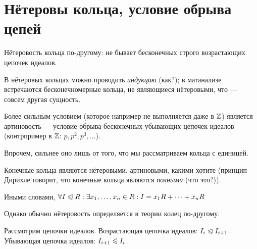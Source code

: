 \documentclass[a4paper]{report}
\begin{document}
    \section{Нётеровы кольца, условие обрыва цепей}


    Нётеровость кольца по-другому: не бывает бесконечных строго возрастающих цепочек идеалов.

    В нётеровых кольцах можно проводить \emph{индукцию} (как?); в матанализе встречаются бесконечномерные кольца, не являющиеся нётеровыми, что --- совсем другая сущность.

    Более сильным условием (которое например не выполняется даже в $\mathbb{Z}$) является артиновость --- условие обрыва бесконечных убывающих цепочек идеалов (контрпример в $\mathbb{Z}$: $p, p^2, p^3, \dots$).

    Впрочем, сильнее оно лишь от того, что мы рассматриваем кольца с единицей.


    Конечные кольца являются нётеровыми, артиновыми, какими хотите (принцип Дирихле говорит, что конечные кольца являются \emph{полными} (что это?)).


    Иными словами, $\forall I \trianglelefteqslant R: \exists x_1, \dots, x_n \in R: I = x_1 R + \dots + x_n R$

    \ok
    Однако обычно нётеровость определяется в теории колец по-другому.

    Рассмотрим цепочки идеалов.
    Возрастающая цепочка идеалов: $I_i \trianglelefteqslant I_{i + 1}$.
    Убывающая цепочка идеалов: $I_{i + 1} \trianglelefteqslant I_i$.
\end{document}
